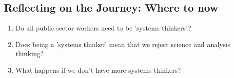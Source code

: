\subsection*{Reflecting on the Journey: Where to now}
\begin{enumerate}
	\item Do all public sector workers need to be 'systems thinkers'?
	\item Does being a 'systems thinker' mean that we reject science and analysis thinking?
	\item What happens if we don't have more systems thinkers?	
\end{enumerate}




